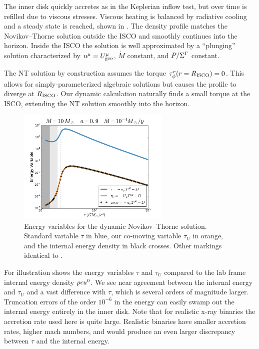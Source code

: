 The inner disk quickly accretes as in the Keplerian inflow test, but over time is refilled due to viscous stresses.  Viscous heating is balanced by radiative cooling and a steady state is reached, shown in .  The density profile matches the Novikov--Thorne solution outside the ISCO and smoothly continues into the horizon.  Inside the ISCO the solution is well approximated by a ``plunging'' solution characterized by $u^\mu = U^\mu_{\rm geo}$, $\dot{M}$ constant, and $P / \Sigma^\Gamma$ constant.  

The NT solution by construction assumes the torque $\tau^r_\phi(r=R_{\rm ISCO}) = 0$.  This allows for simply-parameterized algebraic solutions but causes the profile to diverge at $R_{\rm ISCO}$.  Our dynamic calculation naturally finds a small torque at the ISCO, extending the NT solution smoothly into the horizon.

\begin{figure}
\begin{center}
	\includegraphics[width=0.65\textwidth]{figures/numerics/nt_eps.pdf}
\end{center}
\caption{Energy variables for the dynamic Novikov--Thorne solution. Standard variable $\tau$ in blue, our co-moving variable $\tau_U$ in orange, and the internal energy density in black crosses.  Other markings identical to .  }
\end{figure}

For illustration  shows the energy variables $\tau$ and $\tau_U$ compared to the lab frame internal energy density $\rho \epsilon u^0$.  We see near agreement between the internal energy and $\tau_U$ and a vast difference with $\tau$, which is several orders of magnitude larger.  Truncation errors of the order $10^{-6}$ in the energy can easily swamp out the internal energy entirely in the inner disk.  Note that for realistic x-ray binaries the accretion rate used here is quite large.  Realistic binaries have smaller accretion rates, higher mach numbers, and would produce an even larger discrepancy between $\tau$ and the internal energy.  

